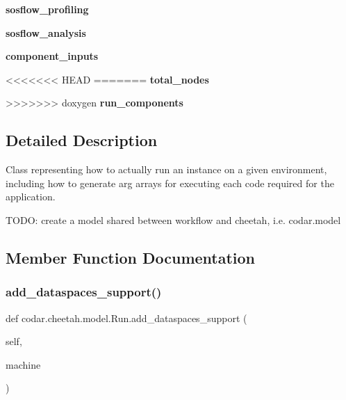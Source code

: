 \begin{DoxyCompactItemize}
{\bfseries sosflow\+\_\+profiling}
\item 
\mbox{\label{classcodar_1_1cheetah_1_1model_1_1_run_a5713827ad4bde77d4fcf46c05f10b554}} 
{\bfseries sosflow\+\_\+analysis}
\item 
\mbox{\label{classcodar_1_1cheetah_1_1model_1_1_run_aef7a539e9aa216737394edbdcf0ea726}} 
{\bfseries component\+\_\+inputs}
\item 
<<<<<<< HEAD
=======
\mbox{\label{classcodar_1_1cheetah_1_1model_1_1_run_a441a213a4a37f8cde9db77ecb9a72e89}} 
{\bfseries total\+\_\+nodes}
\item 
>>>>>>> doxygen
\mbox{\label{classcodar_1_1cheetah_1_1model_1_1_run_a88ee35c04cfd039b398f131a50949305}} 
{\bfseries run\+\_\+components}
\end{DoxyCompactItemize}


\subsection{Detailed Description}
\begin{DoxyVerb}Class representing how to actually run an instance on a given environment,
including how to generate arg arrays for executing each code required for
the application.

TODO: create a model shared between workflow and cheetah, i.e. codar.model
\end{DoxyVerb}
 

\subsection{Member Function Documentation}
\mbox{\label{classcodar_1_1cheetah_1_1model_1_1_run_a5fc7b380524cfda5c77104b61e4441fd}} 
\subsubsection{\texorpdfstring{add\+\_\+dataspaces\+\_\+support()}{add\_dataspaces\_support()}}
{\footnotesize\ttfamily def codar.\+cheetah.\+model.\+Run.\+add\+\_\+dataspaces\+\_\+support (\begin{DoxyParamCaption}\item[{}]{self,  }\item[{}]{machine }\end{DoxyParamCaption})}

